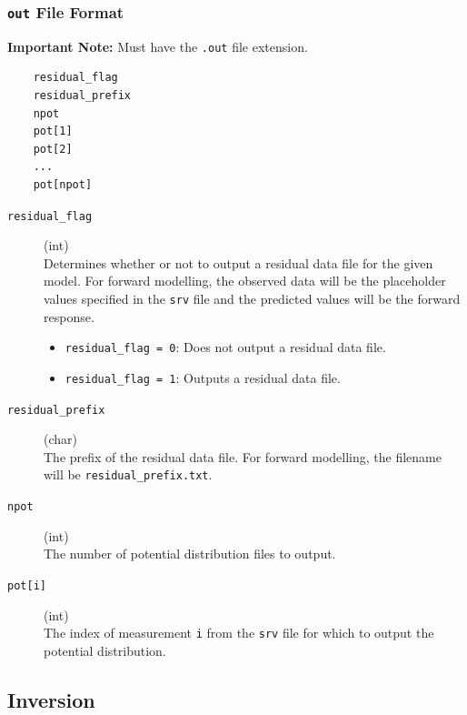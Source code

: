 \documentclass[a4paper,12pt]{article}
\begin{document}
\newpage
\subsubsection{\texttt{out} File Format} \label{forward_out}

\begin{framed}
\noindent \textbf{Important Note:} Must have the \texttt{.out} file extension.
\end{framed}

\begin{framed}
\begin{verbatim}
    residual_flag
    residual_prefix
    npot
    pot[1]
    pot[2]
    ...
    pot[npot]
\end{verbatim}
\end{framed}

\begin{description}
    \item[\texttt{residual\_flag}] (int)\hfill \\
    Determines whether or not to output a residual data file for the given model. For forward modelling, the observed data will be the placeholder values specified in the \texttt{srv} file and the predicted values will be the forward response.
    \begin{itemize}
        \item \texttt{residual\_flag = 0}: Does not output a residual data file.
        \item \texttt{residual\_flag = 1}: Outputs a residual data file.
    \end{itemize}
    
    \item[\texttt{residual\_prefix}] (char)\hfill \\
    The prefix of the residual data file. For forward modelling, the filename will be \texttt{residual\_prefix.txt}.
    
    \item[\texttt{npot}] (int)\hfill \\
    The number of potential distribution files to output.

    \item[\texttt{pot[i]}] (int)\hfill \\
    The index of measurement \texttt{i} from the \texttt{srv} file for which to output the potential distribution.
\end{description}


\newpage
\subsection{Inversion}
\end{document}
